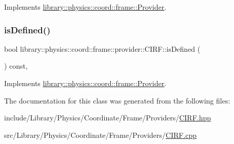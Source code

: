 Implements \hyperlink{classlibrary_1_1physics_1_1coord_1_1frame_1_1_provider_a796fd2dd337f1304a0e9acf573ce2550}{library\+::physics\+::coord\+::frame\+::\+Provider}.

\mbox{\label{classlibrary_1_1physics_1_1coord_1_1frame_1_1provider_1_1_c_i_r_f_ab5676de1c31ad796d56a684615fabdf8}} 
\subsubsection{\texorpdfstring{is\+Defined()}{isDefined()}}
{\footnotesize\ttfamily bool library\+::physics\+::coord\+::frame\+::provider\+::\+C\+I\+R\+F\+::is\+Defined (\begin{DoxyParamCaption}{ }\end{DoxyParamCaption}) const\hspace{0.3cm}{\ttfamily [override]}, {\ttfamily [virtual]}}



Implements \hyperlink{classlibrary_1_1physics_1_1coord_1_1frame_1_1_provider_ae7cd093febf2b20f71400f9f79442774}{library\+::physics\+::coord\+::frame\+::\+Provider}.



The documentation for this class was generated from the following files\+:\begin{DoxyCompactItemize}
\item 
include/\+Library/\+Physics/\+Coordinate/\+Frame/\+Providers/\hyperlink{_c_i_r_f_8hpp}{C\+I\+R\+F.\+hpp}\item 
src/\+Library/\+Physics/\+Coordinate/\+Frame/\+Providers/\hyperlink{_c_i_r_f_8cpp}{C\+I\+R\+F.\+cpp}\end{DoxyCompactItemize}
